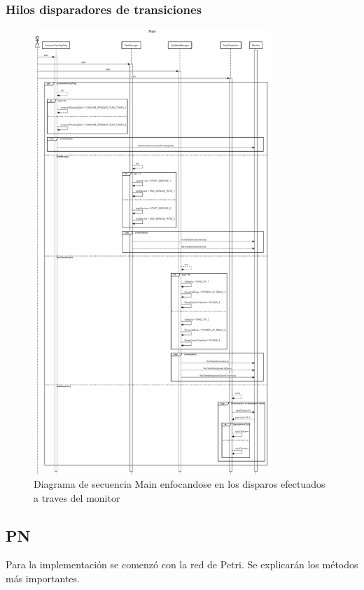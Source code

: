 \documentclass[a4paper,11pt]{article}
\begin{document}
    \subsubsection{Hilos disparadores de transiciones}
    \begin{figure}[H]
        \centering
        \includegraphics[width=0.8\textwidth]{sequence_diag/exports/Main.png}
        \caption{Diagrama de secuencia Main enfocandose en los disparos efectuados a traves del monitor}
        \label{fig:seq_Main}
    \end{figure}

    \subsection{PN}
    Para la implementación se comenzó con la red de Petri.
    Se explicarán los métodos más importantes.
\end{document}
